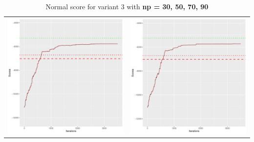 \documentclass[]{scrartcl}
\begin{document}
\begin{table}[h!]
\begin{tabular}{cc}
\includegraphics[scale = 0.4]{./figs/alarm/v3/70/boundsEvolution-3502.pdf} & 
\includegraphics[scale = 0.4]{./figs/alarm/v3/90/boundsEvolution-3502.pdf} \\
\end{tabular}
\caption{Normal score for variant 3 with \textbf{np =  30, 50, 70, 90 }}
\end{table}
\end{document}
